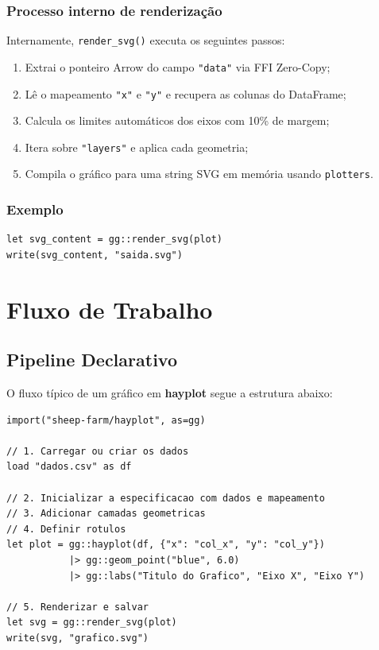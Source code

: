 \documentclass[12pt, a4paper, oneside]{book}
\newcommand{\code}[1]{\texttt{#1}}
\newcommand{\hayplot}{\textbf{hayplot}}
\begin{document}
\subsection*{Processo interno de renderização}

Internamente, \code{render\_svg()} executa os seguintes passos:

\begin{enumerate}
  \item Extrai o ponteiro Arrow do campo \code{"data"} via FFI Zero-Copy;
  \item Lê o mapeamento \code{"x"} e \code{"y"} e recupera as colunas do DataFrame;
  \item Calcula os limites automáticos dos eixos com 10\% de margem;
  \item Itera sobre \code{"layers"} e aplica cada geometria;
  \item Compila o gráfico para uma string SVG em memória usando \code{plotters}.
\end{enumerate}

\subsection*{Exemplo}

\begin{lstlisting}[caption={Renderizando e salvando o SVG}]
let svg_content = gg::render_svg(plot)
write(svg_content, "saida.svg")
\end{lstlisting}

\chapter{Fluxo de Trabalho}

\section{Pipeline Declarativo}

O fluxo típico de um gráfico em \hayplot{} segue a estrutura abaixo:

\begin{lstlisting}[caption={Estrutura geral de um pipeline hayplot}]
import("sheep-farm/hayplot", as=gg)

// 1. Carregar ou criar os dados
load "dados.csv" as df

// 2. Inicializar a especificacao com dados e mapeamento
// 3. Adicionar camadas geometricas
// 4. Definir rotulos
let plot = gg::hayplot(df, {"x": "col_x", "y": "col_y"})
           |> gg::geom_point("blue", 6.0)
           |> gg::labs("Titulo do Grafico", "Eixo X", "Eixo Y")

// 5. Renderizar e salvar
let svg = gg::render_svg(plot)
write(svg, "grafico.svg")
\end{lstlisting}
\end{document}

